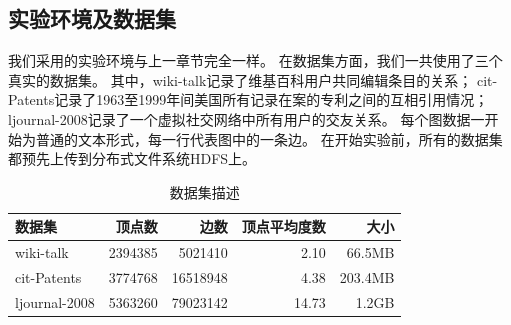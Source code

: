 \documentclass[master]{njuthesis}
\begin{document}
\subsection{实验环境及数据集}
我们采用的实验环境与上一章节完全一样。
在数据集方面，我们一共使用了三个真实的数据集。
其中，wiki-talk记录了维基百科用户共同编辑条目的关系；
cit-Patents记录了1963至1999年间美国所有记录在案的专利之间的互相引用情况；
ljournal-2008记录了一个虚拟社交网络中所有用户的交友关系。
每个图数据一开始为普通的文本形式，每一行代表图中的一条边。
在开始实验前，所有的数据集都预先上传到分布式文件系统HDFS上。
\begin{table}[h]
\caption{数据集描述}
\label{tab:dataset2}
\centering
\begin{tabular}{|l|r|r|r|r|}
\hline
\textbf{数据集} & \textbf{顶点数} & \textbf{边数} & \textbf{顶点平均度数} & \textbf{大小} \\
\hline
wiki-talk     \footnotemark[1]       & \num{2394385} & \num{5021410}          &2.10                   & 66.5MB\\
\hline
cit-Patents      \footnotemark[2]     & \num{3774768}  & \num{16518948 }          & 4.38             & 203.4MB\\
\hline
ljournal-2008  \footnotemark[3] & \num{5363260} & \num{79023142}         & 14.73            &1.2GB\\
\hline
\end{tabular}
\end{table}
\end{document}

